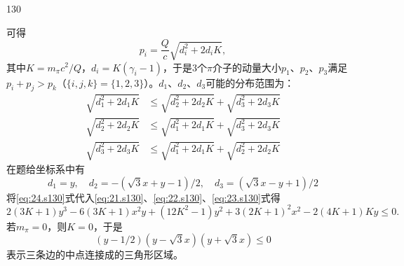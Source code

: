 \begin{solution}{130}
\begin{subsolution}
        可得
        \begin{equation}
            p _ {i} = \frac {Q}{c} \sqrt {d _ {i} ^ {2} + 2 d _ {i} K},
            \label{eq:20.s130}
        \end{equation}
        其中$K = m _ { \pi } c ^ { 2 } / Q$，$d _ { i } = K ( \gamma _ { i } - 1 )$，于是3个$\pi$介子的动量大小$p _ { 1 }$、$p _ { 2 }$、$p _ { 3 }$满足$p _ { i } + p _ { j } > p _ { k }$（$\{ i , j , k \} = \{ 1 , 2 , 3 \}$）。$d _ { 1 }$、$d _ { 2 }$、$d _ { 3 }$可能的分布范围为：
        \begin{align}
            \sqrt {d _ {1} ^ {2} + 2 d _ {1} K} &\leq \sqrt {d _ {2} ^ {2} + 2 d _ {2} K} + \sqrt {d _ {3} ^ {2} + 2 d _ {3} K} \label{eq:21.s130} \\
            \sqrt {d _ {2} ^ {2} + 2 d _ {2} K} &\leq \sqrt {d _ {1} ^ {2} + 2 d _ {1} K} + \sqrt {d _ {3} ^ {2} + 2 d _ {3} K} \label{eq:22.s130} \\
            \sqrt {d _ {3} ^ {2} + 2 d _ {3} K} &\leq \sqrt {d _ {1} ^ {2} + 2 d _ {1} K} + \sqrt {d _ {2} ^ {2} + 2 d _ {2} K} \label{eq:23.s130}
        \end{align}
        在题给坐标系中有
        \begin{equation}
            d _ {1} = y, \quad d _ {2} = - (\sqrt {3} x + y - 1) / 2, \quad d _ {3} = (\sqrt {3} x - y + 1) / 2
            \label{eq:24.s130}
        \end{equation}
        将\eqref{eq:24.s130}式代入\eqref{eq:21.s130}、\eqref{eq:22.s130}、\eqref{eq:23.s130}式得
        \begin{equation}
            2 (3 K + 1) y ^ {3} - 6 (3 K + 1) x ^ {2} y + (12 K ^ {2} - 1) y ^ {2} + 3 (2 K + 1) ^ {2} x ^ {2} - 2 (4 K + 1) K y \leq 0.
            \label{eq:25.s130}
        \end{equation}
        若$m _ { \pi } = 0$，则$K = 0$，于是
        \begin{equation}
            (y - 1 / 2) (y - \sqrt {3} x) (y + \sqrt {3} x) \leq 0
            \label{eq:26.s130}
        \end{equation}
        表示三条边的中点连接成的三角形区域。
    \end{subsolution}
\end{solution}